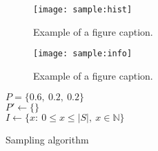 \documentclass[conference]{IEEEtran}
\begin{document}
\begin{figure*}[h]
    \texttt{[image: sample:hist]}
    \caption{Example of a figure caption. \label{fig:sample:hist}}
\end{figure*}

\begin{figure}[h]
    \texttt{[image: sample:info]}
    \caption{Example of a figure caption. \label{fig:sample:info}}
\end{figure}

\begin{algorithm}
    $P = \{0.6,\ 0.2,\ 0.2\}$\\
    $P' \gets \{\}$\\
    $I \gets \{x:\ 0\leq x\leq \lvert S\rvert,\ x\in\mathbb{N}\}$\\
    \caption{Sampling algorithm}\label{sampling:alg}
\end{algorithm}


\end{document}
